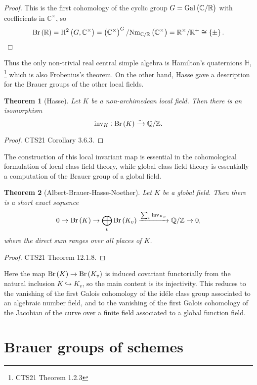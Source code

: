 \documentclass{article}
\newtheorem*{theorem}{Theorem}
\newcommand{\br}{\del}
\newcommand{\Br}{\mathrm{Br}}
\newcommand{\CC}{\mathbb{C}}
\newcommand{\Gal}{\mathrm{Gal}}
\renewcommand{\H}{\mathrm{H}}
\newcommand{\HH}{\mathbb{H}}
\newcommand{\inv}{\mathrm{inv}}
\newcommand{\Nm}{\mathrm{Nm}}
\newcommand{\QQ}{\mathbb{Q}}
\newcommand{\RR}{\mathbb{R}}
\newcommand{\ZZ}{\mathbb{Z}}
\begin{document}
\begin{proof}
This is the first cohomology of the cyclic group $ G = \Gal\br{\CC / \RR} $ with coefficients in $ \CC^\times $, so
$$ \Br\br{\RR} = \H^2\br{G, \CC^\times} = \br{\CC^\times}^G / \Nm_{\CC / \RR}\br{\CC^\times} = \RR^\times / \RR^+ \cong \cbr{\pm}. $$
\end{proof}

Thus the only non-trivial real central simple algebra is Hamilton's quaternions $ \HH $, \footnote{CTS21 Theorem 1.2.3} which is also Frobenius's theorem. On the other hand, Hasse gave a description for the Brauer groups of the other local fields.

\begin{theorem}[Hasse]
Let $ K $ be a non-archimedean local field. Then there is an isomorphism
$$ \inv_K : \Br\br{K} \xrightarrow{\sim} \QQ / \ZZ. $$
\end{theorem}

\begin{proof}
CTS21 Corollary 3.6.3.
\end{proof}

The construction of this local invariant map is essential in the cohomological formulation of local class field theory, while global class field theory is essentially a computation of the Brauer group of a global field.

\begin{theorem}[Albert-Brauer-Hasse-Noether]
Let $ K $ be a global field. Then there is a short exact sequence
$$ 0 \to \Br\br{K} \to \bigoplus_v \Br\br{K_v} \xrightarrow{\sum_v \inv_{K_v}} \QQ / \ZZ \to 0, $$
where the direct sum ranges over all places of $ K $.
\end{theorem}

\begin{proof}
CTS21 Theorem 12.1.8.
\end{proof}

Here the map $ \Br\br{K} \to \Br\br{K_v} $ is induced covariant functorially from the natural inclusion $ K \hookrightarrow K_v $, so the main content is its injectivity. This reduces to the vanishing of the first Galois cohomology of the id\'ele class group associated to an algebraic number field, and to the vanishing of the first Galois cohomology of the Jacobian of the curve over a finite field associated to a global function field.

\section{Brauer groups of schemes}
\end{document}
